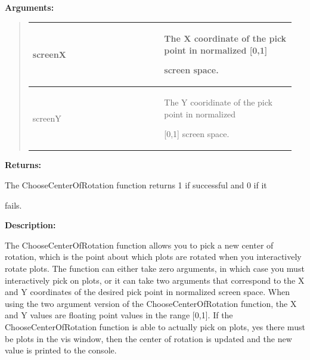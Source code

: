 \documentclass[letterpaper,10pt,english]{sphinxmanual}
\begin{document}
\begin{DUlineblock}{0em}
\item[] 
\item[] \textbf{Arguments:}
\end{DUlineblock}
\begin{quote}

\begin{tabular}{|p{0.475\linewidth}|p{0.475\linewidth}|}
\hline

screenX
 & 
\begin{DUlineblock}{0em}
\item[] The X coordinate of the pick point in normalized {[}0,1{]}
\item[] screen space.
\end{DUlineblock}
\\
\hline
screenY
 & 
\begin{DUlineblock}{0em}
\item[] The Y cooridinate of the pick point in normalized
\item[] {[}0,1{]} screen space.
\end{DUlineblock}
\\
\hline\end{tabular}

\end{quote}

\begin{DUlineblock}{0em}
\item[] 
\item[] \textbf{Returns:}
\item[] The ChooseCenterOfRotation function returns 1 if successful and 0 if it
\item[] fails.
\item[] 
\item[] \textbf{Description:}
\item[] The ChooseCenterOfRotation function allows you to pick a new center of
rotation, which is the point about which plots are rotated when you
interactively rotate plots. The function can either take zero arguments, in
which case you must interactively pick on plots, or it can take two
arguments that correspond to the X and Y coordinates of the desired pick
point in normalized screen space. When using the two argument version of
the ChooseCenterOfRotation function, the X and Y values are floating point
values in the range {[}0,1{]}. If the ChooseCenterOfRotation function is able
to actually pick on plots, yes there must be plots in the vis window, then
the center of rotation is updated and the new value is printed to the
console.
\end{DUlineblock}
\end{document}
